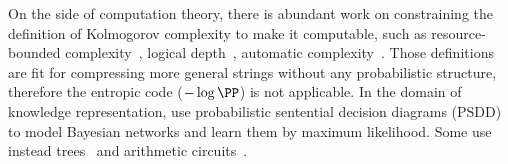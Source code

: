 On the side of computation theory, there is abundant work on constraining the definition of Kolmogorov complexity to make it computable, such as 
%
resource-bounded complexity~\citep{barzdin1968complexity}, logical depth~\citep{chaitin1977algorithmic}, automatic complexity~\citep{shallit2001automatic}.%
Those definitions are fit for compressing more general strings without any probabilistic structure, therefore the entropic code ($-\log \PP$) is not applicable. 
%
In the domain of knowledge representation, \cite{shen2018conditional,kisa2014probabilistic} use probabilistic sentential decision diagrams (PSDD) to model Bayesian networks and learn them by maximum likelihood. Some use instead trees~\citep{chen2022definition} and arithmetic circuits~\citep{darwiche2022causal, huang2024causal}.

%